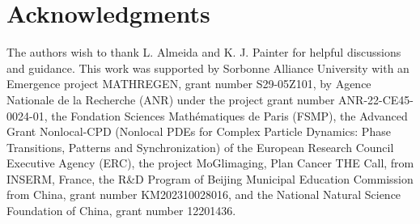 \documentclass{aims} %
\theoremstyle{definition}
\begin{document}
{%







\section*{Acknowledgments}
The authors wish to thank L. Almeida and K. J. Painter for helpful discussions and guidance. This work was supported by Sorbonne Alliance University with an Emergence project MATHREGEN, grant number S29-05Z101, by Agence Nationale de la Recherche (ANR) under the project grant number ANR-22-CE45-0024-01, the Fondation Sciences Mathématiques de Paris (FSMP), the Advanced Grant Nonlocal-CPD (Nonlocal PDEs for Complex Particle Dynamics: Phase Transitions, Patterns and Synchronization) of the European Research Council Executive Agency (ERC), the project MoGlimaging, Plan Cancer THE Call, from INSERM, France, 
the R\&D Program of Beijing Municipal Education Commission from China, grant number KM202310028016, 
and the National Natural Science Foundation of China, grant number 12201436.


}
\end{document}
